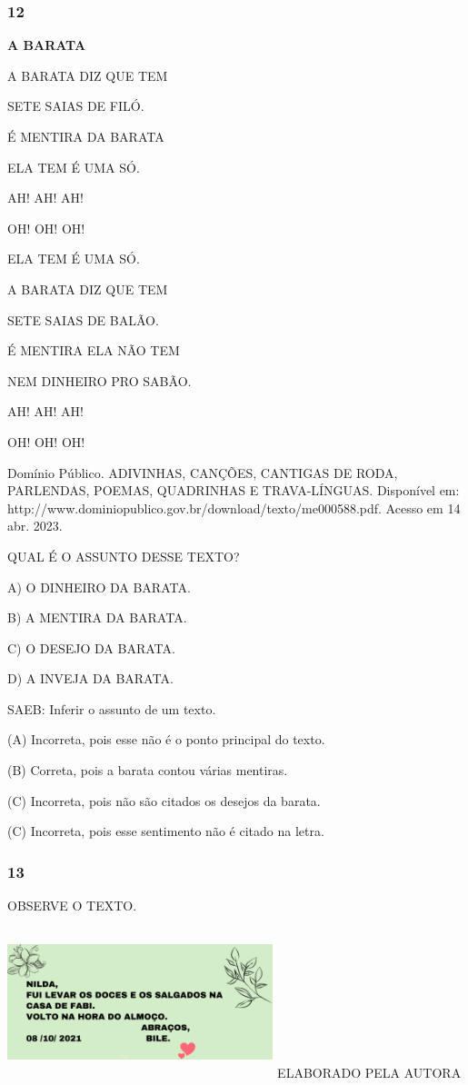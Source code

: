 \subsubsection{12}\label{section-52}

\textbf{A BARATA}

A BARATA DIZ QUE TEM

SETE SAIAS DE FILÓ.

É MENTIRA DA BARATA

ELA TEM É UMA SÓ.

AH! AH! AH!

OH! OH! OH!

ELA TEM É UMA SÓ.

A BARATA DIZ QUE TEM

SETE SAIAS DE BALÃO.

É MENTIRA ELA NÃO TEM

NEM DINHEIRO PRO SABÃO.

AH! AH! AH!

OH! OH! OH!

Domínio Público. ADIVINHAS, CANÇÕES, CANTIGAS DE RODA, PARLENDAS, POEMAS, QUADRINHAS E TRAVA-LÍNGUAS. Disponível em: http://www.dominiopublico.gov.br/download/texto/me000588.pdf. Acesso em 14 abr. 2023.

QUAL É O ASSUNTO DESSE TEXTO?

A) O DINHEIRO DA BARATA.

B) A MENTIRA DA BARATA.

C) O DESEJO DA BARATA.

D) A INVEJA DA BARATA.

SAEB: Inferir o assunto de um texto.

(A) Incorreta, pois esse não é o ponto principal do texto.

(B) Correta, pois a barata contou várias mentiras.

(C) Incorreta, pois não são citados os desejos da barata.

(C) Incorreta, pois esse sentimento não é citado na letra.

\subsubsection{13 }\label{section-53}

OBSERVE O TEXTO.

\includegraphics[width=3.04633in,height=1.71374in]{media/image220.png}
ELABORADO PELA AUTORA

